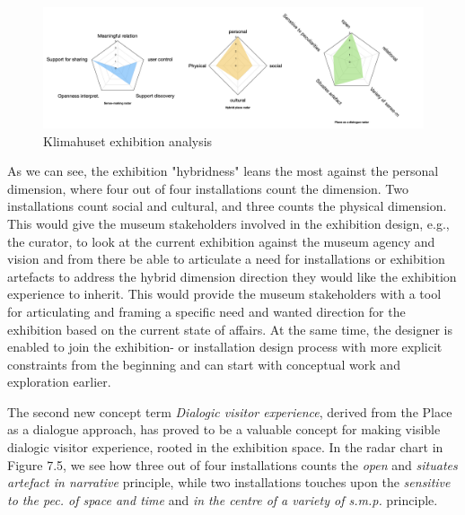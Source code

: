 \begin{figure}[H]
\centering 
\includegraphics[width=13cm]{pictures/analysis/klimahuset_analysis_radars.png}
\caption{Klimahuset exhibition analysis}
\end{figure}

As we can see, the exhibition "hybridness" leans the most against the personal dimension, where four out of four installations count the dimension. Two installations count social and cultural, and three counts the physical dimension. This would give the museum stakeholders involved in the exhibition design, e.g., the curator, to look at the current exhibition against the museum agency and vision and from there be able to articulate a need for installations or exhibition artefacts to address the hybrid dimension direction they would like the exhibition experience to inherit. This would provide the museum stakeholders with a tool for articulating and framing a specific need and wanted direction for the exhibition based on the current state of affairs. At the same time, the designer is enabled to join the exhibition- or installation design process with more explicit constraints from the beginning and can start with conceptual work and exploration earlier.

The second new concept term \textit{Dialogic visitor experience}, derived from the Place as a dialogue approach, has proved to be a valuable concept for making visible dialogic visitor experience, rooted in the exhibition space. In the radar chart in Figure 7.5, we see how three out of four installations counts the \emph{open} and \emph{situates artefact in narrative} principle, while two installations touches upon the \emph{sensitive to the pec. of space and time} and \emph{in the centre of a variety of s.m.p.} principle.



